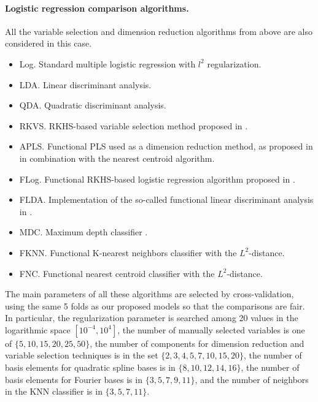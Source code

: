 \paragraph{Logistic regression comparison algorithms.} All the variable selection and dimension reduction algorithms from above are also considered in this case.
\begin{itemize}
  \item Log.\hspace{.3em} Standard multiple logistic regression with \(l^2\) regularization.
  \item LDA.\hspace{.3em} Linear discriminant analysis.
  \item QDA.\hspace{.3em} Quadratic discriminant analysis.
  \item RKVS.\hspace{.3em} RKHS-based variable selection method proposed in \citet{berrendero2018use}.
  \item APLS.\hspace{.3em} Functional PLS used as a dimension reduction method, as proposed in \citet{delaigle2012achieving} in combination with the nearest centroid algorithm.
  \item FLog.\hspace{.3em} Functional RKHS-based logistic regression algorithm proposed in \citet{berrendero2018functional}.
  \item FLDA.\hspace{.3em} Implementation of the so-called functional linear discriminant analysis in \citet{preda2007pls}.
  \item MDC.\hspace{.3em} Maximum depth classifier \citep[e.g.][]{ghosh2005maximum}.
  \item FKNN.\hspace{.3em} Functional K-nearest neighbors classifier with the \(L^2\)-distance.
  \item FNC.\hspace{.3em} Functional nearest centroid classifier with the \(L^2\)-distance.
\end{itemize}

The main parameters of all these algorithms are selected by cross-validation, using the same 5 folds as our proposed models so that the comparisons are fair. In particular, the regularization parameter is searched among 20 values in the logarithmic space \([10^{-4}, 10^4]\), the number of manually selected variables is one of \(\{5, 10, 15, 20, 25, 50\}\), the number of components for dimension reduction and variable selection techniques is in the set \(\{2, 3, 4, 5, 7, 10, 15, 20\}\), the number of basis elements for quadratic spline bases is in \(\{8,10,12,14,16\}\), the number of basis elements for Fourier bases is in \(\{3,5,7,9,11\}\), and the number of neighbors in the KNN classifier is in \(\{3,5,7,11\}\).

